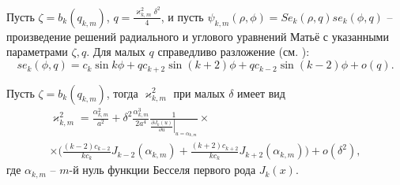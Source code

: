 Пусть $\zeta = b_k(q_{k,m})$, $q=\frac{\varkappa_{k,m}^2 \delta^2}{4}$, и пусть 
$\psi_{k,m}(\rho, \phi) = Se_k(\rho, q)se_k(\phi, q)$ -- произведение решений радиального и углового уравнений Матьё с указанными параметрами $\zeta, q$. Для малых $q$ справедливо разложение (см. \cite[\S~2.2, с.~122---124]{wref12}):
$$se_k(\phi, q) = c_k \sin{k \phi} + q c_{k+2} \sin{(k+2) \phi} +q c_{k-2} \sin{(k-2) \phi} + o(q).$$ 
\begin{lemma}
Пусть $\zeta = b_k(q_{k, m})$, тогда $\varkappa_{k,m}^2$ при малых $\delta$ имеет вид
\begin{multline*}
\varkappa_{k, m}^2 = 
\frac{\alpha_{k, m}^2}{a^2} +  \delta^2 \frac{\alpha_{k, m}^3}{2 a^4}\frac{1}{\left.\frac{\partial J_{k} (u)}{\partial u}\right|_{u=\alpha_{k, m}}} \times \\ \times
\biggl(
\frac{(k-2)c_{k-2}}{k c_k} J_{k-2}(\alpha_{k, m}) + \frac{(k+2)c_{k+2} }{k c_k} J_{k+2}(\alpha_{k, m})
\biggr) + o(\delta^2),
\end{multline*}
где $\alpha_{k, m}$ -- $m$-й нуль функции Бесселя первого рода $J_{k}(x)$.
\label{th:lemEllipse2}
\end{lemma}
